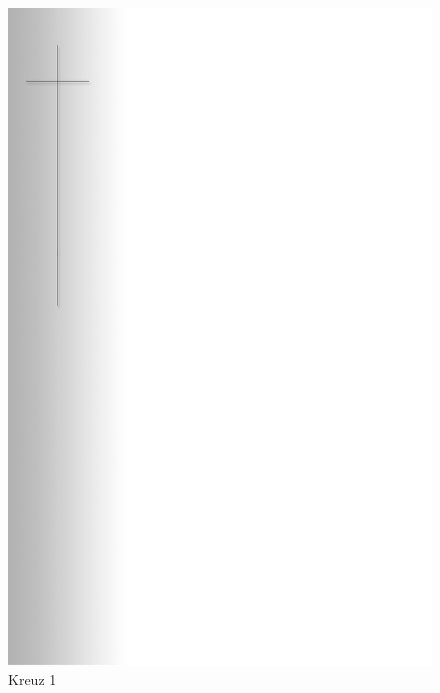 \documentclass[ngerman,a4paper,11pt]{scrreprt}
\begin{document}
\begin{figure}[H]
\centering
\includegraphics[width=\textwidth,height=.8\textheight,keepaspectratio]{Bilder/Bilder/750_0010_12278_1032674_Kreuz.png}
\caption{\label{img_Kreuz_1}Kreuz 1}
\end{figure}
\end{document}
